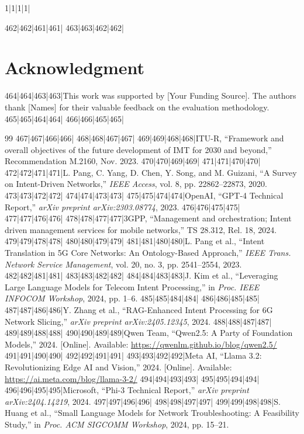 1|1|1|1|\documentclass[10pt,conference]{IEEEtran}
\begin{document}
462|462|461|461|
463|463|462|462|\section*{Acknowledgment}
464|464|463|463|This work was supported by [Your Funding Source]. The authors thank [Names] for their valuable feedback on the evaluation methodology.
465|465|464|464|
466|466|465|465|\begin{thebibliography}{99}
467|467|466|466|
468|468|467|467|
469|469|468|468|ITU-R, ``Framework and overall objectives of the future development of IMT for 2030 and beyond,'' Recommendation M.2160, Nov. 2023.
470|470|469|469|
471|471|470|470|
472|472|471|471|L. Pang, C. Yang, D. Chen, Y. Song, and M. Guizani, ``A Survey on Intent-Driven Networks,'' \textit{IEEE Access}, vol. 8, pp. 22862--22873, 2020.
473|473|472|472|
474|474|473|473|
475|475|474|474|OpenAI, ``GPT-4 Technical Report,'' \textit{arXiv preprint arXiv:2303.08774}, 2023.
476|476|475|475|
477|477|476|476|
478|478|477|477|3GPP, ``Management and orchestration; Intent driven management services for mobile networks,'' TS 28.312, Rel. 18, 2024.
479|479|478|478|
480|480|479|479|
481|481|480|480|L. Pang et al., ``Intent Translation in 5G Core Networks: An Ontology-Based Approach,'' \textit{IEEE Trans. Network Service Management}, vol. 20, no. 3, pp. 2541--2554, 2023.
482|482|481|481|
483|483|482|482|
484|484|483|483|J. Kim et al., ``Leveraging Large Language Models for Telecom Intent Processing,'' in \textit{Proc. IEEE INFOCOM Workshop}, 2024, pp. 1--6.
485|485|484|484|
486|486|485|485|
487|487|486|486|Y. Zhang et al., ``RAG-Enhanced Intent Processing for 6G Network Slicing,'' \textit{arXiv preprint arXiv:2405.12345}, 2024.
488|488|487|487|
489|489|488|488|
490|490|489|489|Qwen Team, ``Qwen2.5: A Party of Foundation Models,'' 2024. [Online]. Available: \url{https://qwenlm.github.io/blog/qwen2.5/}
491|491|490|490|
492|492|491|491|
493|493|492|492|Meta AI, ``Llama 3.2: Revolutionizing Edge AI and Vision,'' 2024. [Online]. Available: \url{https://ai.meta.com/blog/llama-3-2/}
494|494|493|493|
495|495|494|494|
496|496|495|495|Microsoft, ``Phi-3 Technical Report,'' \textit{arXiv preprint arXiv:2404.14219}, 2024.
497|497|496|496|
498|498|497|497|
499|499|498|498|S. Huang et al., ``Small Language Models for Network Troubleshooting: A Feasibility Study,'' in \textit{Proc. ACM SIGCOMM Workshop}, 2024, pp. 15--21.

\end{thebibliography}
\end{document}
